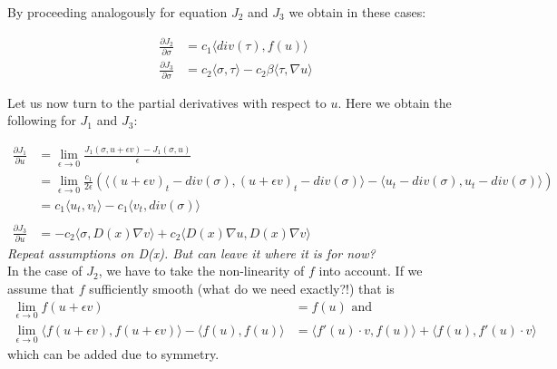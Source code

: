 \documentclass[../draft_1.tex]{subfiles}
\begin{document}

By proceeding analogously for equation $J_2$ and $J_3$ we obtain in these cases: 

\begin{align}
\frac{\partial J_2}{\partial \sigma} &= c_1 \langle div(\tau), f(u) \rangle \\
\frac{\partial J_3}{\partial \sigma} &= c_2 \langle \sigma, \tau \rangle - c_2 \beta \langle \tau, \nabla u \rangle
\end{align}


Let us now turn to the partial derivatives with respect to $u$. Here we obtain the following for $J_1$ and $J_3$:

\begin{equation}
\begin{aligned}
\frac{\partial J_1}{\partial u} &=   \lim_{\epsilon \rightarrow 0} \frac{J_1(\sigma, u + \epsilon v) - J_1(\sigma, u)}{\epsilon}  \\
&= \lim_{\epsilon \rightarrow 0} \frac{c_1}{2 \epsilon} (\langle (u + \epsilon v)_t - div(\sigma), (u + \epsilon v)_t - div(\sigma) \rangle - \langle u_t - div(\sigma), u_t - div(\sigma) \rangle) \\
&= c_1 \langle u_t, v_t \rangle - c_1 \langle v_t, div(\sigma) \rangle \\
\\
\frac{\partial J_3}{\partial u} &= - c_2 \langle \sigma, D(x) \nabla v \rangle + c_2 \langle D(x) \nabla u, D(x) \nabla v \rangle
\end{aligned}
\end{equation}
\textit{Repeat assumptions on D(x). But can leave it where it is for now?} 
\smallskip 
\\
In the case of $J_2$, we have to take the non-linearity of $f$ into account. If we assume that $f$ sufficiently smooth (what do we need exactly?!) that is 
\begin{align}  
\lim_{\epsilon \rightarrow 0} f(u + \epsilon v) &= f(u) \text{ and } \\
\lim_{\epsilon \rightarrow 0} \langle f(u+ \epsilon v), f(u + \epsilon v) \rangle - \langle f(u), f(u) \rangle &= \langle f'(u) \cdot v, f(u) \rangle + \langle f(u), f'(u) \cdot v \rangle
\end{align} 
which can be added due to symmetry.
\end{document}
